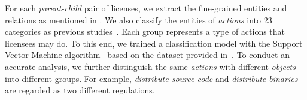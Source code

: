 For each \textit{parent-child} pair of licenses, we extract the fine-grained entities and relations as mentioned in .  We also classify the entities of \textit{actions} into 23 categories as previous studies~\cite{APSEC`17-Kapitsaki-termsIdentifying,kapitsaki2019modeling,xu2021lidetector}. Each group represents a type of actions that licensees may do. To this end, we trained a classification model with the Support Vector Machine algorithm~\cite{hearst1998support} based on the dataset provided in~\cite{xu2021lidetector}. To conduct an accurate analysis, we further distinguish the same \textit{actions} with different \textit{objects} into different groups. For example, \textit{distribute source code} and \textit{distribute binaries} are regarded as two different regulations. 

